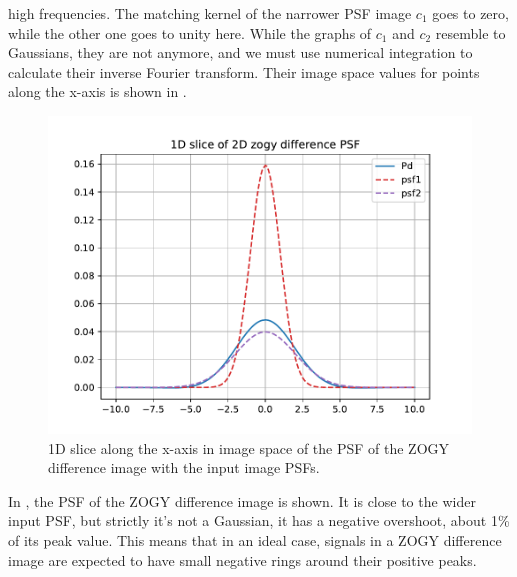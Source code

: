 high frequencies. The matching kernel of the narrower PSF image \(c_1\) goes
to zero, while the other one goes to unity here. While the graphs of \(c_1\)
and \(c_2\) resemble to Gaussians, they are not anymore, and we must use
numerical integration to calculate their inverse Fourier transform. Their
image space values for points along the x-axis is shown in
.
%
\begin{figure}
\begin{center}
\includegraphics[width=5.5in]{fig/zogy_theo_Gaussians_img_Pd.pdf}
\end{center}
\caption{\label{fig:theo_Gaussians_img_Pd}1D slice along the x-axis in image
  space of the PSF of the ZOGY difference image with the input image PSFs.}
\end{figure}
%
\par In , the PSF of the ZOGY difference
  image is shown. It is close to the wider input PSF, but strictly it's not
  a Gaussian, it has a negative overshoot, about 1\% of its peak
  value. This means that in an ideal case, signals in a ZOGY difference
  image are expected to have small negative rings around their positive
  peaks.
%
